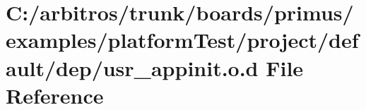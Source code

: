 \hypertarget{platform_test_2project_2default_2dep_2usr__app_init_8o_8d}{\section{C\-:/arbitros/trunk/boards/primus/examples/platform\-Test/project/default/dep/usr\-\_\-appinit.o.\-d File Reference}
\label{platform_test_2project_2default_2dep_2usr__app_init_8o_8d}
}
